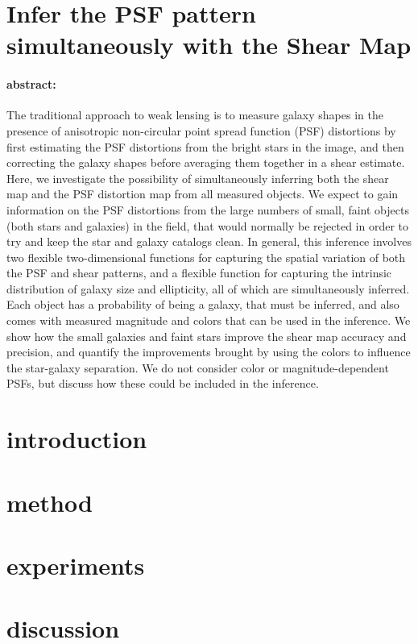 \documentclass[12pt,letterpaper]{article}
\begin{document}
\sloppy\sloppypar

\section*{Infer the PSF pattern simultaneously with the Shear Map}

\paragraph{abstract:}

The traditional approach to weak lensing is to measure galaxy shapes in the
presence of anisotropic non-circular point spread function (PSF) distortions
by first estimating the PSF distortions from the bright stars in the image,
and then correcting the galaxy shapes before averaging them together in a
shear estimate. Here, we investigate the possibility of simultaneously
inferring both the shear map and the PSF distortion map from all measured
objects. We expect to gain information on the PSF distortions from the large
numbers of small, faint objects (both stars and galaxies) in the field, that
would normally be rejected in order to try and keep the star and galaxy
catalogs clean. In general, this inference involves two flexible
two-dimensional functions for capturing the spatial variation of both the PSF
and shear patterns, and a flexible function for capturing the intrinsic
distribution of galaxy size and ellipticity, all of which are simultaneously
inferred. Each object has a probability of being a galaxy, that must be
inferred, and also comes with measured magnitude and colors that can be used
in the inference. We show how the small galaxies and faint stars improve the
shear map accuracy and precision, and quantify the improvements brought by
using the colors to influence the star-galaxy separation. We do not consider
color or magnitude-dependent PSFs, but discuss how these could be included in
the inference.


\section{introduction}

\section{method}

\section{experiments}

\section{discussion}
\end{document}
